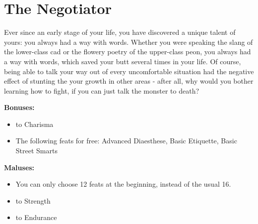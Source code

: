 \section{The Negotiator}
Ever since an early stage of your life, you have discovered a unique talent of yours: you always had a way with words. Whether you were speaking the slang of the lower-class cad or the flowery poetry of the upper-class peon, you always had a way with words, which saved your butt several times in your life. Of course, being able to talk your way out of every uncomfortable situation had the negative effect of stunting the your growth in other areas - after all, why would you bother learning how to fight, if you can just talk the monster to death?


\textbf{Bonuses:}
\begin{itemize}
	\item {} to Charisma
	\item The following feats for free: Advanced Diaesthese, Basic Etiquette, Basic Street Smarts
\end{itemize}


\textbf{Maluses:}
\begin{itemize}
	\item You can only choose 12 feats at the beginning, instead of the usual 16.
	\item {} to Strength
	\item {} to Endurance
\end{itemize}
